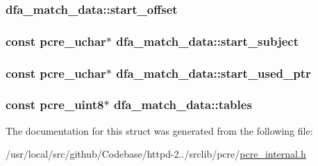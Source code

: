 \subsubsection[{\texorpdfstring{start\+\_\+offset}{start_offset}}]{ dfa\+\_\+match\+\_\+data\+::start\+\_\+offset}\hypertarget{structdfa__match__data_a62e37bf7f1ae88322f1af0c99ef7f0b2}{}\label{structdfa__match__data_a62e37bf7f1ae88322f1af0c99ef7f0b2}
\subsubsection[{\texorpdfstring{start\+\_\+subject}{start_subject}}]{\setlength{\rightskip}{0pt plus 5cm}const {\bf pcre\+\_\+uchar}$\ast$ dfa\+\_\+match\+\_\+data\+::start\+\_\+subject}\hypertarget{structdfa__match__data_a913b4a197ede6daa315552a852219f48}{}\label{structdfa__match__data_a913b4a197ede6daa315552a852219f48}
\subsubsection[{\texorpdfstring{start\+\_\+used\+\_\+ptr}{start_used_ptr}}]{\setlength{\rightskip}{0pt plus 5cm}const {\bf pcre\+\_\+uchar}$\ast$ dfa\+\_\+match\+\_\+data\+::start\+\_\+used\+\_\+ptr}\hypertarget{structdfa__match__data_ad33a2bafb99408460ead8f4571d36391}{}\label{structdfa__match__data_ad33a2bafb99408460ead8f4571d36391}
\subsubsection[{\texorpdfstring{tables}{tables}}]{\setlength{\rightskip}{0pt plus 5cm}const {\bf pcre\+\_\+uint8}$\ast$ dfa\+\_\+match\+\_\+data\+::tables}\hypertarget{structdfa__match__data_a41a371c2cc917e05962d34a152a6304c}{}\label{structdfa__match__data_a41a371c2cc917e05962d34a152a6304c}


The documentation for this struct was generated from the following file\+:\begin{DoxyCompactItemize}
\item 
/usr/local/src/github/\+Codebase/httpd-\/2../srclib/pcre/\hyperlink{pcre__internal_8h}{pcre\+\_\+internal.\+h}\end{DoxyCompactItemize}
